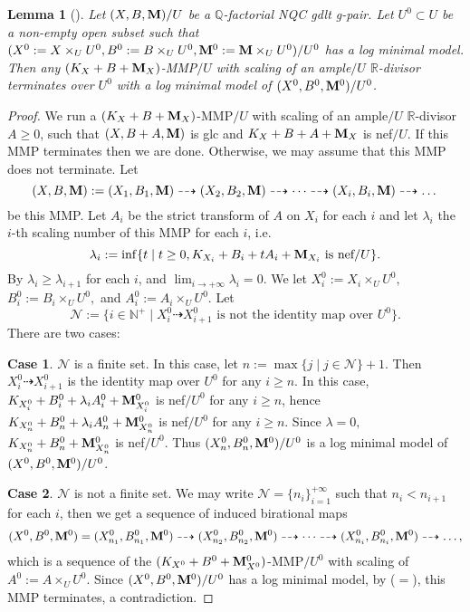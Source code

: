 \documentclass[11pt]{amsart}
\numberwithin{equation}{section}
\newcommand{\Mm}{{\bf{M}}}
\newcommand{\Qq}{\mathbb{Q}}
\newcommand{\Rr}{\mathbb{R}}
\newtheorem{lem}[thm]{Lemma}
\theoremstyle{definition}
\theoremstyle{definition}
\theoremstyle{definition}
\begin{document}
\begin{lem}[{\cite[Version 2, Lemma 2.39]{HL21}}]\label{lem: termination over open subset}
Let $(X,B,\Mm)/U$ be a $\Qq$-factorial NQC gdlt g-pair. Let $U^0\subset U$ be a non-empty open subset such that $(X^0:=X\times_UU^0,B^0:=B\times_UU^0,\Mm^0:=\Mm\times_UU^0)/U^0$ has a log minimal model. Then any $(K_X+B+\Mm_X)$-MMP$/U$ with scaling of an ample$/U$ $\Rr$-divisor terminates over $U^0$ with a log minimal model of $(X^0,B^0,\Mm^0)/U^0$.
\end{lem}
\begin{proof}
We run a $(K_X+B+\Mm_X)$-MMP$/U$ with scaling of an ample$/U$ $\Rr$-divisor $A\geq 0$, such that $(X,B+A,\Mm)$ is glc and $K_X+B+A+\Mm_X$ is nef$/U$. If this MMP terminates then we are done. Otherwise, we may assume that this MMP does not terminate. Let
$$(X,B,\Mm):=(X_1,B_1,\Mm)\dashrightarrow (X_2,B_2,\Mm)\dashrightarrow\dots\dashrightarrow (X_i,B_i,\Mm)\dashrightarrow\dots$$
be this MMP. Let $A_i$ be the strict transform of $A$ on $X_i$ for each $i$ and let $\lambda_i$ the $i$-th scaling number of this MMP for each $i$, i.e.
$$\lambda_i:=\inf\{t\mid t\geq 0, K_{X_i}+B_i+tA_i+\Mm_{X_i}\text{ is nef/}U\}.$$
By \cite[Remark 3.21]{HL18} $\lambda_i\geq\lambda_{i+1}$ for each $i$, and $\lim_{i\rightarrow+\infty}\lambda_i=0$. We let $X_i^0:=X_i\times_UU^0,$ $B_i^0:=B_i\times_UU^0,$ and $A_i^0:=A_i\times_UU^0$. Let 
$$\mathcal{N}:=\{i\in\mathbb N^+\mid X^0_i\dashrightarrow X^0_{i+1} \text{ is not the identity map over }U^0\}.$$ 
There are two cases:

\medskip

\noindent\textbf{Case 1}. $\mathcal{N}$ is a finite set. In this case, let $n:=\max\{j\mid j\in\mathcal{N}\}+1$. Then $X^0_i\dashrightarrow X^0_{i+1}$ is the identity map over $U^0$ for any $i\geq n$. In this case, $K_{X_i^0}+B_i^0+\lambda_iA_i^0+\Mm^0_{X_i^0}$ is nef$/U^0$ for any $i\geq n$, hence $K_{X_n^0}+B_n^0+\lambda_iA_n^0+\Mm^0_{X_n^0}$ is nef$/U^0$ for any $i\geq n$. Since $\lambda=0, $ $K_{X_n^0}+B_n^0+\Mm^0_{X_n^0}$ is nef$/U^0$. Thus $(X_n^0,B_n^0,\Mm^0)/U^0$ is a log minimal model of $(X^0,B^0,\Mm^0)/U^0$.

\medskip

\noindent\textbf{Case 2}. $\mathcal{N}$ is not a finite set. We may write $\mathcal{N}=\{n_i\}_{i=1}^{+\infty}$ such that $n_i<n_{i+1}$ for each $i$, then we get a sequence of induced birational maps
$$(X^0,B^0,\Mm^0)=(X^0_{n_1},B^0_{n_1},\Mm^0)\dashrightarrow (X^0_{n_2},B^0_{n_2},\Mm^0)\dashrightarrow\dots\dashrightarrow (X^0_{n_i},B^0_{n_i},\Mm^0)\dashrightarrow\dots,$$
which is a sequence of the $(K_{X^0}+B^0+\Mm^0_{X^0})$-MMP$/U^0$ with scaling of $A^0:=A\times_UU^0$. Since $(X^0,B^0,\Mm^0)/U^0$ has a log minimal model, by \cite[Theorem 2.8]{HL21} ($=$\cite[Version 3,Theorem 2.24]{HL21}), this MMP terminates, a contradiction.
\end{proof}
\end{document}
